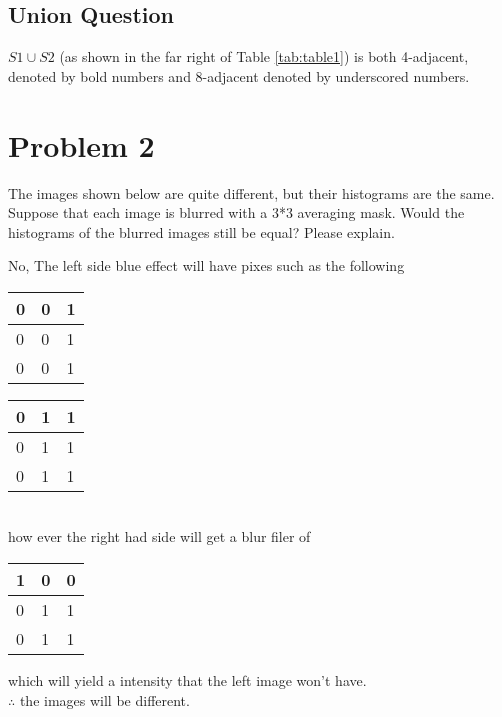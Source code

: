 \documentclass[12pt]{article}
\begin{document}
        \subsection{Union Question}
        $ S1 \cup S2 $ (as shown in the far right of Table \ref{tab:table1}) is both
        4-adjacent, denoted by bold numbers and 8-adjacent denoted by underscored numbers.
    \newpage
    \section{Problem 2}
    The images shown below are quite different, but their histograms are the same. 
    Suppose that each image is blurred with a 3*3 averaging mask. Would the 
    histograms of the blurred images still be equal? Please explain.
    
    No, The left side blue effect will have pixes such as the following
    \\
    \begin{tabular}{ | l | l | l | }
        \hline
        0 & 0 & 1\\\hline
        0 & 0 & 1\\\hline
        0 & 0 & 1\\\hline
        \end{tabular} 
     \begin{tabular}{ | l | l | l | }
            \hline
            0 & 1 & 1\\\hline
            0 & 1 & 1\\\hline
            0 & 1 & 1\\\hline
            \end{tabular}
    \\
    how ever the right had side will get a blur filer of 
    \\
    \begin{tabular}{ | l | l | l | }
        \hline
        1 & 0 & 0\\\hline
        0 & 1 & 1\\\hline
        0 & 1 & 1\\\hline
        \end{tabular}
    which will yield a intensity that the left image won't have. \\
    $\therefore$ the images will be different.
\end{document}
